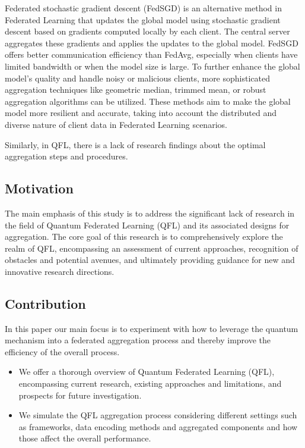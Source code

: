Federated stochastic gradient descent (FedSGD) is an alternative method in Federated Learning that updates the global model using stochastic gradient descent based on gradients computed locally by each client. The central server aggregates these gradients and applies the updates to the global model. FedSGD offers better communication efficiency than FedAvg, especially when clients have limited bandwidth or when the model size is large. To further enhance the global model's quality and handle noisy or malicious clients, more sophisticated aggregation techniques like geometric median, trimmed mean, or robust aggregation algorithms can be utilized. These methods aim to make the global model more resilient and accurate, taking into account the distributed and diverse nature of client data in Federated Learning scenarios.

Similarly, in QFL, there is a lack of research findings about the optimal aggregation steps and procedures.
\subsection{Motivation}
The main emphasis of this study is to address the significant lack of research in the field of Quantum Federated Learning (QFL) and its associated designs for aggregation. The core goal of this research is to comprehensively explore the realm of QFL, encompassing an assessment of current approaches, recognition of obstacles and potential avenues, and ultimately providing guidance for new and innovative research directions.

\subsection{Contribution}

In this paper our main focus is to experiment with how to leverage the quantum mechanism into a federated aggregation process and thereby improve the efficiency of the overall process.

\begin{itemize}
    \item We offer a thorough overview of Quantum Federated Learning (QFL), encompassing current research, existing approaches and limitations, and prospects for future investigation.
    \item We simulate the QFL aggregation process considering different settings such as frameworks, data encoding methods and aggregated components and how those affect the overall performance.
\end{itemize}


